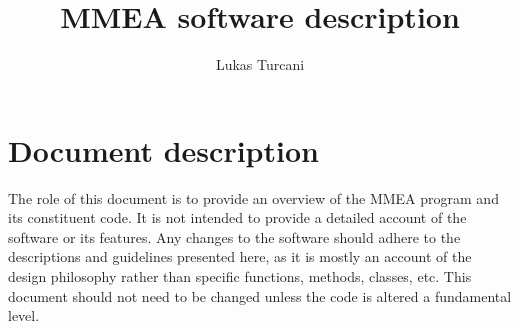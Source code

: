 \documentclass[a4paper, titlepage]{article}
\title{MMEA software description}
\author{Lukas Turcani}
\begin{document}
\maketitle
\tableofcontents
\pagebreak

\section{Document description}
The role of this document is to provide an overview of the MMEA program and its constituent code. It is not intended to provide a detailed account of the software or its features. Any changes to the software should adhere to the descriptions and guidelines presented here, as it is mostly an account of the design philosophy rather than specific functions, methods, classes, etc. This document should not need to be changed unless the code is altered a fundamental level.
       
\end{document}
